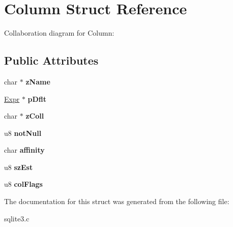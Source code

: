 \hypertarget{structColumn}{}\section{Column Struct Reference}
\label{structColumn}


Collaboration diagram for Column\+:
\subsection*{Public Attributes}
\begin{DoxyCompactItemize}
\item 
char $\ast$ {\bfseries z\+Name}\hypertarget{structColumn_a6450a4e9fde68b3a2d79425d826eccc3}{}\label{structColumn_a6450a4e9fde68b3a2d79425d826eccc3}

\item 
\hyperlink{structExpr}{Expr} $\ast$ {\bfseries p\+Dflt}\hypertarget{structColumn_ac4178f302df70048235660979f84ffe4}{}\label{structColumn_ac4178f302df70048235660979f84ffe4}

\item 
char $\ast$ {\bfseries z\+Coll}\hypertarget{structColumn_aa95909d5c77b321258622ed28d7b96eb}{}\label{structColumn_aa95909d5c77b321258622ed28d7b96eb}

\item 
u8 {\bfseries not\+Null}\hypertarget{structColumn_a852e9a4c1c327a64d9b051dcafda3841}{}\label{structColumn_a852e9a4c1c327a64d9b051dcafda3841}

\item 
char {\bfseries affinity}\hypertarget{structColumn_ac9d6fe31c45888cecaf3f5ad5b93bf23}{}\label{structColumn_ac9d6fe31c45888cecaf3f5ad5b93bf23}

\item 
u8 {\bfseries sz\+Est}\hypertarget{structColumn_a6d28f0023e550ea38ad2ab544942114d}{}\label{structColumn_a6d28f0023e550ea38ad2ab544942114d}

\item 
u8 {\bfseries col\+Flags}\hypertarget{structColumn_aadfed8f7a238c314e1499a6c4090f920}{}\label{structColumn_aadfed8f7a238c314e1499a6c4090f920}

\end{DoxyCompactItemize}


The documentation for this struct was generated from the following file\+:\begin{DoxyCompactItemize}
\item 
sqlite3.\+c\end{DoxyCompactItemize}
